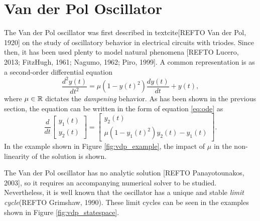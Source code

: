 \section{Van der Pol Oscillator}

The Van der Pol oscillator was first described in textcite[REFTO Van der Pol, 1920] on the study of oscillatory behavior in electrical circuits with triodes.
Since then, it has been used plenty to model natural phenomena [REFTO Lucero, 2013; FitzHugh, 1961; Nagumo, 1962; Piro, 1999].
A common representation is as a second-order differential equation \[
    \frac{d^2 y(t)}{dt^2} = \mu\left( 1-y(t)^2 \right) \frac{d y(t)}{dt} + y(t)
,\] 
where $\mu\in \mathbb{R}$ dictates the \emph{dampening} behavior. 
As has been shown in the previous section, the equation can be written in the form of equation \eqref{eq:ode} as
\begin{equation}\label{eq:vdp}
    \frac{d}{dt}\begin{bmatrix} y_1\left( t \right) \\ y_2\left( t \right)  \end{bmatrix} = \begin{bmatrix} 
y_2\left( t \right) \\
\mu\left( 1-y_1\left( t \right) ^2 \right) y_2\left( t \right) - y_1(t)
\end{bmatrix} 
.\end{equation}
In the example shown in Figure \ref{fig:vdp_example}, the impact of $\mu$ in the non-linearity of the solution is shown.

The Van der Pol oscillator has no analytic solution [REFTO Panayotounakos, 2003], so it requires an accompanying numerical solver to be studied.
Nevertheless, it is well known that the oscillator has a unique and stable \emph{limit cycle}\footnotemark (REFTO Grimshaw, 1990). 
These limit cycles can be seen in the examples shown in Figure \ref{fig:vdp_statespace}.

